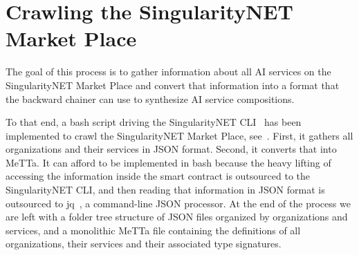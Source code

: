 \documentclass[]{report}
\begin{document}
\section{Crawling the SingularityNET Market Place}
\label{sec:csnmp}
The goal of this process is to gather information about all AI
services on the SingularityNET Market Place and convert that
information into a format that the backward chainer can use to
synthesize AI service compositions.

To that end, a bash script driving the SingularityNET
CLI~\cite{SNETCLI} has been implemented to crawl the SingularityNET
Market Place, see~\cite{SNETCrawler}.  First, it gathers all
organizations and their services in JSON format.  Second, it converts
that into MeTTa.  It can afford to be implemented in bash because the
heavy lifting of accessing the information inside the smart contract
is outsourced to the SingularityNET CLI, and then reading that
information in JSON format is outsourced to jq~\cite{JQ}, a
command-line JSON processor.  At the end of the process we are left
with a folder tree structure of JSON files organized by organizations
and services, and a monolithic MeTTa file containing the definitions
of all organizations, their services and their associated type
signatures.
\end{document}
